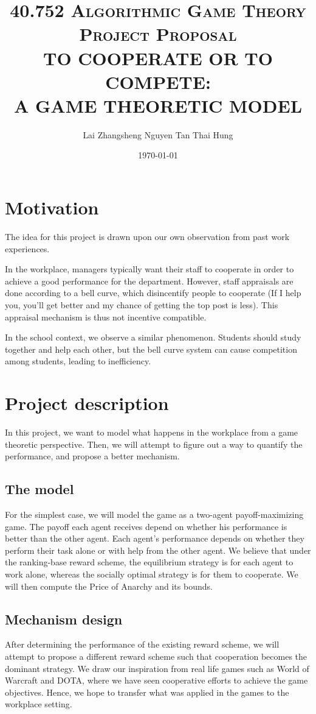 \documentclass[11pt, a4paper]{article}
\title{
	\vspace*{-1.5cm}
	\scshape 40.752 Algorithmic Game Theory\\
	\vspace{0.5cm}
	Project Proposal\\
	\vspace{0.5cm}
	{\bfseries\Large TO COOPERATE OR TO COMPETE: \\
		A GAME THEORETIC MODEL}\\
	\vspace{0.5cm}}
\author{Lai Zhangsheng \qquad \qquad Nguyen Tan Thai Hung}
\date{\today}
\begin{document}
\maketitle


\section{Motivation}
The idea for this project is drawn upon our own observation from past work experiences. 

In the workplace, managers typically want their staff to cooperate in order to achieve a good performance for the department. However, staff appraisals are done according to a bell curve, which disincentify people to cooperate (If I help you, you'll get better and my chance of getting the top post is less). This appraisal mechanism is thus not incentive compatible. 

In the school context, we observe a similar phenomenon. Students should study together and help each other, but the bell curve system can cause competition among students, leading to inefficiency.

\section{Project description}
In this project, we want to model what happens in the workplace from a game theoretic perspective. Then, we will attempt to figure out a way to quantify the performance, and propose a better mechanism.

\subsection{The model}
For the simplest case, we will model the game as a two-agent payoff-maximizing game. The payoff each agent receives depend on whether his performance is better than the other agent. Each agent's performance depends on whether they perform their task alone or with help from the other agent. We believe that under the ranking-base reward scheme, the equilibrium strategy is for each agent to work alone, whereas the socially optimal strategy is for them to cooperate. We will then compute the Price of Anarchy and its bounds.

\subsection{Mechanism design}
After determining the performance of the existing reward scheme, we will attempt to propose a different reward scheme such that cooperation becomes the dominant strategy. We draw our inspiration from real life games such as World of Warcraft and DOTA, where we have seen cooperative efforts to achieve the game objectives. Hence, we hope to transfer what was applied in the games to the workplace setting.
\end{document}
